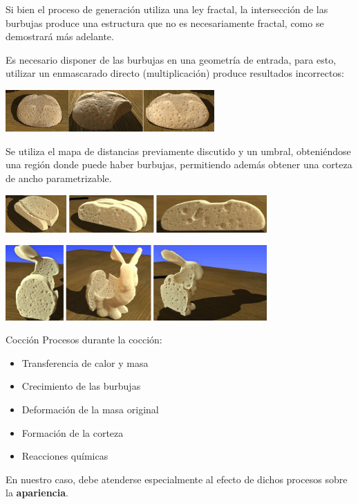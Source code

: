 \documentclass[spanish]{beamer}
\begin{document}
\begin{frame}
Si bien el proceso de generación utiliza una ley fractal, la intersección de las burbujas produce una estructura que no es necesariamente fractal, como se demostrará más adelante.

\vspace{1cm}

Es necesario disponer de las burbujas en una geometría de entrada, para esto, utilizar un enmascarado directo (multiplicación) produce resultados incorrectos:

\centerline{\includegraphics[width=8cm]{../figures/intersectProblem}}
\end{frame}

\begin{frame}
Se utiliza el mapa de distancias previamente discutido y un umbral, obteniéndose una región donde puede haber burbujas, permitiendo además obtener una corteza de ancho parametrizable.


\centerline{\includegraphics[width=10cm]{../figures/prebakebread}}
\centerline{\includegraphics[width=10cm]{../figures/prebakebunny}}
\end{frame}


\begin{frame}{Cocción}
Procesos durante la cocción:

\begin{itemize}
\item Transferencia de calor y masa
\item Crecimiento de las burbujas
\item Deformación de la masa original
\item Formación de la corteza
\item Reacciones químicas
\end{itemize}

En nuestro caso, debe atenderse especialmente al efecto de dichos procesos sobre la \textbf{apariencia}.

\end{frame}
\end{document}
